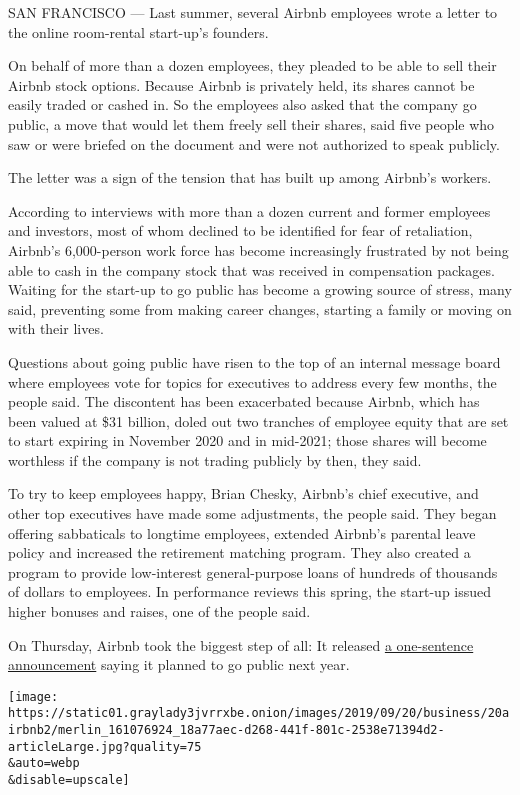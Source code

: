 SAN FRANCISCO --- Last summer, several Airbnb employees wrote a letter
to the online room-rental start-up's founders.

On behalf of more than a dozen employees, they pleaded to be able to
sell their Airbnb stock options. Because Airbnb is privately held, its
shares cannot be easily traded or cashed in. So the employees also asked
that the company go public, a move that would let them freely sell their
shares, said five people who saw or were briefed on the document and
were not authorized to speak publicly.

The letter was a sign of the tension that has built up among Airbnb's
workers.

According to interviews with more than a dozen current and former
employees and investors, most of whom declined to be identified for fear
of retaliation, Airbnb's 6,000-person work force has become increasingly
frustrated by not being able to cash in the company stock that was
received in compensation packages. Waiting for the start-up to go public
has become a growing source of stress, many said, preventing some from
making career changes, starting a family or moving on with their lives.

Questions about going public have risen to the top of an internal
message board where employees vote for topics for executives to address
every few months, the people said. The discontent has been exacerbated
because Airbnb, which has been valued at \$31 billion, doled out two
tranches of employee equity that are set to start expiring in November
2020 and in mid-2021; those shares will become worthless if the company
is not trading publicly by then, they said.

To try to keep employees happy, Brian Chesky, Airbnb's chief executive,
and other top executives have made some adjustments, the people said.
They began offering sabbaticals to longtime employees, extended Airbnb's
parental leave policy and increased the retirement matching program.
They also created a program to provide low-interest general-purpose
loans of hundreds of thousands of dollars to employees. In performance
reviews this spring, the start-up issued higher bonuses and raises, one
of the people said.

On Thursday, Airbnb took the biggest step of all: It released
\href{https://press.airbnb.com/airbnb-announces-intention-to-become-a-publicly-traded-company-during-2020/}{a
one-sentence announcement} saying it planned to go public next year.

\texttt{[image: https://static01.graylady3jvrrxbe.onion/images/2019/09/20/business/20airbnb2/merlin\_161076924\_18a77aec-d268-441f-801c-2538e71394d2-articleLarge.jpg?quality=75\\\&auto=webp\\\&disable=upscale]}

